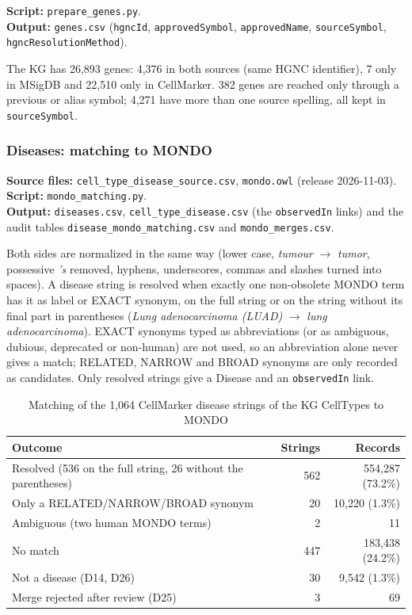 {\raggedright \noindent\textbf{Script:} \texttt{prepare\_genes.py}.\\ \textbf{Output:} \texttt{genes.csv} (\texttt{hgncId}, \texttt{approvedSymbol}, \texttt{approvedName}, \texttt{sourceSymbol}, \texttt{hgncResolutionMethod}).\par}
The KG has 26,893 genes: 4,376 in both sources (same HGNC identifier), 7 only in MSigDB and 22,510 only in CellMarker. 382 genes are reached only through a previous or alias symbol; 4,271 have more than one source spelling, all kept in \texttt{sourceSymbol}.

\subsubsection{Diseases: matching to MONDO}

{\raggedright \noindent\textbf{Source files:} \texttt{cell\_type\_disease\_source.csv}, \texttt{mondo.owl} (release 2026-11-03).\\ \textbf{Script:} \texttt{mondo\_matching.py}.\\ \textbf{Output:} \texttt{diseases.csv}, \texttt{cell\_type\_disease.csv} (the \texttt{observedIn} links) and the audit tables \texttt{disease\_mondo\_matching.csv} and \texttt{mondo\_merges.csv}.\par}

Both sides are normalized in the same way (lower case, \emph{tumour} $\rightarrow$ \emph{tumor}, possessive \emph{'s} removed, hyphens, underscores, commas and slashes turned into spaces). A disease string is resolved when exactly one non-obsolete MONDO term has it as label or EXACT synonym, on the full string or on the string without its final part in parentheses (\emph{Lung adenocarcinoma (LUAD)} $\rightarrow$ \emph{lung adenocarcinoma}). EXACT synonyms typed as abbreviations (or as ambiguous, dubious, deprecated or non-human) are not used, so an abbreviation alone never gives a match; RELATED, NARROW and BROAD synonyms are only recorded as candidates. Only resolved strings give a Disease and an \texttt{observedIn} link.

\begin{table}[htbp]
\centering
\small
\begin{tabularx}{\linewidth}{|X|r|r|}
\hline
\textbf{Outcome} & \textbf{Strings} & \textbf{Records} \\ \hline
Resolved (536 on the full string, 26 without the parentheses) & 562 & 554,287 (73.2\%) \\ \hline
Only a RELATED/NARROW/BROAD synonym & 20 & 10,220 (1.3\%) \\ \hline
Ambiguous (two human MONDO terms) & 2 & 11 \\ \hline
No match & 447 & 183,438 (24.2\%) \\ \hline
Not a disease (D14, D26) & 30 & 9,542 (1.3\%) \\ \hline
Merge rejected after review (D25) & 3 & 69 \\ \hline
\end{tabularx}
\caption{Matching of the 1,064 CellMarker disease strings of the KG CellTypes to MONDO}
\label{tab:mondo-matching}
\end{table}

